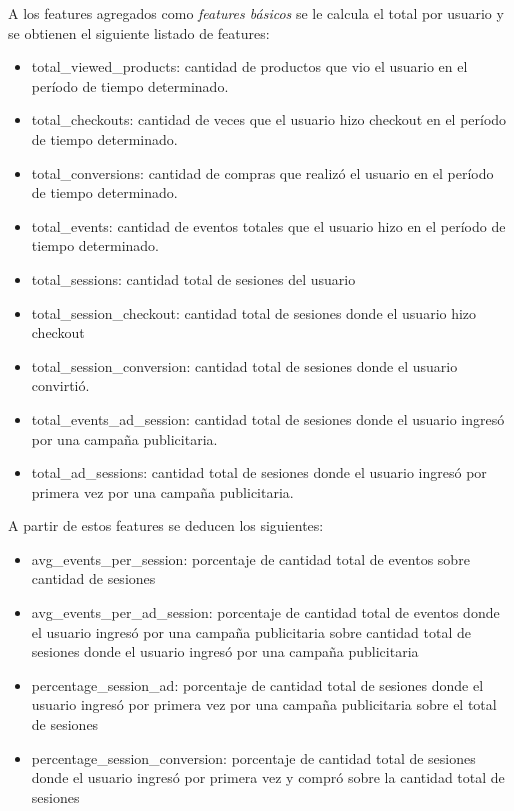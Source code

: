 \documentclass[a4paper]{article}
\begin{document}
A los features agregados como \textit{features básicos} se le calcula el total por usuario y se obtienen el siguiente listado de features:
\begin{itemize}
	\item total\_viewed\_products: cantidad de productos que vio el usuario en el período de tiempo determinado.
	\item total\_checkouts: cantidad de veces que el usuario hizo checkout en el período de tiempo determinado.
	\item total\_conversions: cantidad de compras que realizó el usuario en el período de tiempo determinado.
	\item total\_events: cantidad de eventos totales que el usuario hizo en el período de tiempo determinado.
	\item total\_sessions: cantidad total de sesiones del usuario
	\item total\_session\_checkout: cantidad total de sesiones donde el usuario hizo checkout
	\item total\_session\_conversion: cantidad total de sesiones donde el usuario convirtió.
	\item total\_events\_ad\_session: cantidad total de sesiones donde el usuario ingresó por una campaña publicitaria.
	\item total\_ad\_sessions: cantidad total de sesiones donde el usuario ingresó por primera vez por una campaña publicitaria.
\end{itemize}
	
A partir de estos features se deducen los siguientes:

\begin{itemize}
	\item avg\_events\_per\_session: porcentaje de cantidad total de eventos sobre cantidad de sesiones
	\item avg\_events\_per\_ad\_session: porcentaje de cantidad total de eventos donde el usuario ingresó por una campaña publicitaria sobre cantidad total de sesiones donde el usuario ingresó por una campaña publicitaria
	\item percentage\_session\_ad: porcentaje de cantidad total de sesiones donde el usuario ingresó por primera vez por una campaña publicitaria sobre el total de sesiones
	\item percentage\_session\_conversion: porcentaje de cantidad total de sesiones donde el usuario ingresó por primera vez y compró sobre la cantidad total de sesiones
	
\end{itemize}
\end{document}
